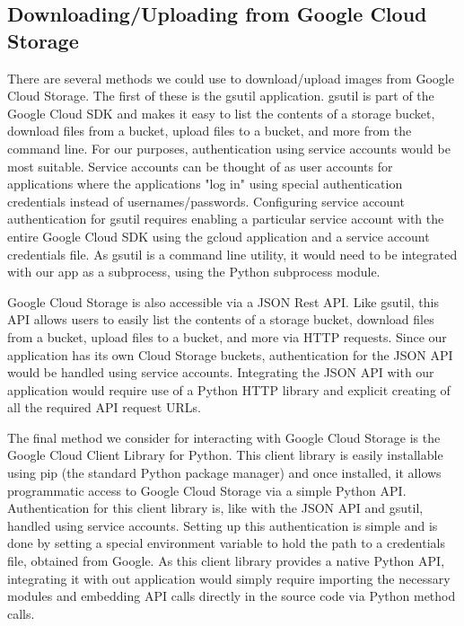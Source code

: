 \documentclass[10pt, onecolumn, draftclsnofoot, letterpaper, compsoc]{IEEEtran}
\begin{document}
\subsection{Downloading/Uploading from Google Cloud Storage}

There are several methods we could use to download/upload images from Google Cloud
Storage. The first of these is the gsutil application. gsutil is part of the Google
Cloud SDK and makes it easy to list the contents of a storage bucket, download files
from a bucket, upload files to a bucket, and more from the command 
line\cite{gsutil, cloudStorage}. For our purposes, authentication using
service accounts would be most suitable. Service accounts can be
thought of as user accounts for applications where the applications "log in"
using special authentication credentials instead of usernames/passwords. Configuring
service account authentication for gsutil requires enabling a particular service
account with the entire Google Cloud SDK using the gcloud application and a service
account credentials file. As gsutil is a command line utility, it would need to be
integrated with our app as a subprocess, using the Python subprocess module.

Google Cloud Storage is also accessible via a JSON Rest API. Like gsutil, this API 
allows users to easily list the contents of a storage bucket, download files from 
a bucket, upload files to a bucket, and more via HTTP requests\cite{cloudStorageJSON}.
Since our application has its own Cloud Storage buckets, authentication for the
JSON API would be handled using service accounts\cite{cloudStorageJSON}. Integrating 
the JSON API with our application would require use of a Python HTTP library and explicit creating
of all the required API request URLs\cite{cloudStorageJSON}.

The final method we consider for interacting with Google Cloud Storage is the
Google Cloud Client Library for Python. This client library is easily
installable using pip (the standard Python package manager) and once installed,
it allows programmatic access to Google Cloud Storage via a simple Python
API\cite{cloudStorageLib}. Authentication for this client library is, like with 
the JSON API and gsutil, handled using service accounts\cite{cloudStorageLib}. 
Setting up this authentication is simple and is done by setting a special 
environment variable to hold the path to a credentials file, obtained from 
Google\cite{cloudStorageLib}. As this client library provides a native Python 
API, integrating it with out application would simply require importing the 
necessary modules and embedding API calls directly in the source code via 
Python method calls\cite{cloudStorageLib}.
\end{document}
